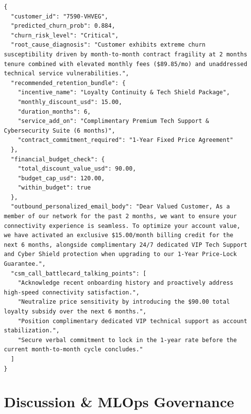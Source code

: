 \documentclass[journal,compsoc]{IEEEtran}
\begin{document}
\begin{lstlisting}[caption={Agentic JSON Output with Budget Enforcement for Account 7590-VHVEG.}, label={lst:agent}]
{
  "customer_id": "7590-VHVEG",
  "predicted_churn_prob": 0.884,
  "churn_risk_level": "Critical",
  "root_cause_diagnosis": "Customer exhibits extreme churn susceptibility driven by month-to-month contract fragility at 2 months tenure combined with elevated monthly fees ($89.85/mo) and unaddressed technical service vulnerabilities.",
  "recommended_retention_bundle": {
    "incentive_name": "Loyalty Continuity & Tech Shield Package",
    "monthly_discount_usd": 15.00,
    "duration_months": 6,
    "service_add_on": "Complimentary Premium Tech Support & Cybersecurity Suite (6 months)",
    "contract_commitment_required": "1-Year Fixed Price Agreement"
  },
  "financial_budget_check": {
    "total_discount_value_usd": 90.00,
    "budget_cap_usd": 120.00,
    "within_budget": true
  },
  "outbound_personalized_email_body": "Dear Valued Customer, As a member of our network for the past 2 months, we want to ensure your connectivity experience is seamless. To optimize your account value, we have activated an exclusive $15.00/month billing credit for the next 6 months, alongside complimentary 24/7 dedicated VIP Tech Support and Cyber Shield protection when upgrading to our 1-Year Price-Lock Guarantee.",
  "csm_call_battlecard_talking_points": [
    "Acknowledge recent onboarding history and proactively address high-speed connectivity satisfaction.",
    "Neutralize price sensitivity by introducing the $90.00 total loyalty subsidy over the next 6 months.",
    "Position complimentary dedicated VIP technical support as account stabilization.",
    "Secure verbal commitment to lock in the 1-year rate before the current month-to-month cycle concludes."
  ]
}
\end{lstlisting}

\section{Discussion \& MLOps Governance}
\end{document}
